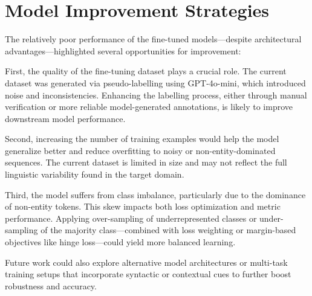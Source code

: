 \section{Model Improvement Strategies}

The relatively poor performance of the fine-tuned models—despite architectural advantages—highlighted several opportunities for improvement:

First, the quality of the fine-tuning dataset plays a crucial role. The current dataset was generated via pseudo-labelling using GPT-4o-mini, which introduced noise and inconsistencies. Enhancing the labelling process, either through manual verification or more reliable model-generated annotations, is likely to improve downstream model performance.

Second, increasing the number of training examples would help the model generalize better and reduce overfitting to noisy or non-entity-dominated sequences. The current dataset is limited in size and may not reflect the full linguistic variability found in the target domain.

Third, the model suffers from class imbalance, particularly due to the dominance of non-entity tokens. This skew impacts both loss optimization and metric performance. Applying over-sampling of underrepresented classes or under-sampling of the majority class—combined with loss weighting or margin-based objectives like hinge loss—could yield more balanced learning.

Future work could also explore alternative model architectures or multi-task training setups that incorporate syntactic or contextual cues to further boost robustness and accuracy.
